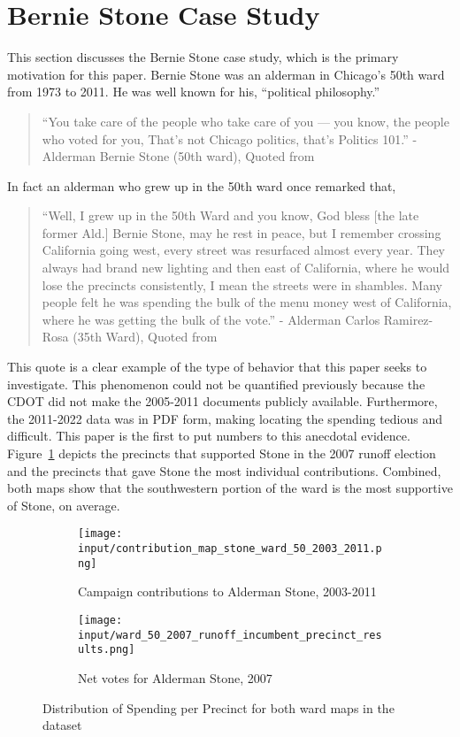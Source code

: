 \section{Bernie Stone Case Study}\label{sec:case_study}
This section discusses the Bernie Stone case study, which is the primary motivation for this paper.
Bernie Stone was an alderman in Chicago's 50th ward from 1973 to 2011.
He was well known for his, ``political philosophy.''

\begin{quotation}
    ``You take care of the people who take care of you — you know, the people who voted for you, That’s not Chicago politics, that’s Politics 101.'' - Alderman Bernie Stone (50th ward), Quoted from~\cite{BGA_berniequote}
\end{quotation}

In fact an alderman who grew up in the 50th ward once remarked that,

\begin{quotation}
    ``Well, I grew up in the 50th Ward and you know, God bless [the late former Ald.] Bernie Stone, may he rest in peace, but I remember crossing California going west, every street was resurfaced almost every year. They always had brand new lighting and then east of California, where he would lose the precincts consistently, I mean the streets were in shambles. Many people felt he was spending the bulk of the menu money west of California, where he was getting the bulk of the vote.'' - Alderman Carlos Ramirez-Rosa (35th Ward), Quoted from~\cite{ramirezrosaquote}
\end{quotation}

This quote is a clear example of the type of behavior that this paper seeks to investigate.
This phenomenon could not be quantified previously because the CDOT did not make the 2005-2011 documents publicly available. 
Furthermore, the 2011-2022 data was in PDF form, making locating the spending tedious and difficult.
This paper is the first to put numbers to this anecdotal evidence.
Figure~\ref{fig:stone_support_maps} depicts the precincts that supported Stone in the 2007 runoff election and the precincts that gave Stone the most individual contributions.
Combined, both maps show that the southwestern portion of the ward is the most supportive of Stone, on average.
\begin{figure}[H]
    \centering
    \begin{subfigure}[b]{0.45\textwidth} %
    \texttt{[image: input/contribution\_map\_stone\_ward\_50\_2003\_2011.png]}
    \caption{Campaign contributions to Alderman Stone, 2003-2011}
    \end{subfigure}
    \hfill %
    \begin{subfigure}[b]{0.45\textwidth}
    \texttt{[image: input/ward\_50\_2007\_runoff\_incumbent\_precinct\_results.png]}
    \caption{Net votes for Alderman Stone, 2007}
    \end{subfigure}
    \caption{Distribution of Spending per Precinct for both ward maps in the dataset}
    \label{fig:stone_support_maps}
\end{figure}

